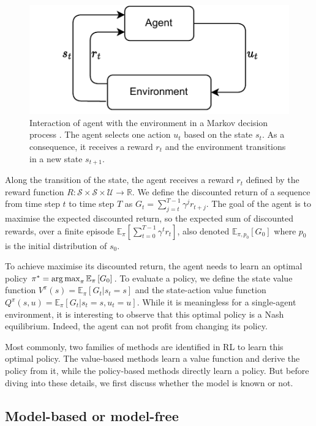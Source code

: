 \begin{figure}[h]
    \centering
    \includegraphics[width=.8\linewidth]{tex_thesis/figures/ch2/MDP.pdf}
    \caption{Interaction of agent with the environment in a Markov decision process \citep{sutton2018reinforcement}. The agent selects one action $u_t$ based on the state $s_t$. As a consequence, it receives a reward $r_t$ and the environment transitions in a new state $s_{t+1}$.}
    \label{fig:ch2_mdp}
\end{figure}

Along the transition of the state, the agent receives a reward $r_t$ defined by the reward function $R:\mathcal{S} \times \mathcal{S} \times \mathcal{U} \rightarrow \mathbb{R}$.
We define the discounted return of a sequence from time step $t$ to time step $T$ as $G_t= \sum_{j=t}^{T-1} \gamma^j r_{t+j}$.
The goal of the agent is to maximise the expected discounted return, so the expected sum of discounted rewards, over a finite episode $\mathbb{E}_{\pi} \left[\sum_{t=0}^{T-1} \gamma^t r_t \right]$, also denoted $\mathbb{E}_{\pi, p_0}\left[ G_0 \right]$ where $p_0$ is the initial distribution of $s_0$.

To achieve maximise its discounted return, the agent needs to learn an optimal policy $\pi^* = \operatorname*{arg\,max}_\pi \mathbb{E}_{\pi}\left[ G_0 \right]$.
To evaluate a policy, we define the state value function $V^\pi(s) = \mathbb{E}_{\pi}\left[G_t|s_t=s\right]$ and the state-action value function $Q^\pi(s, u) = \mathbb{E}_{\pi}\left[G_t|s_t=s, u_t=u\right]$.
While it is meaningless for a single-agent environment, it is interesting to observe that this optimal policy is a Nash equilibrium.
Indeed, the agent can not profit from changing its policy.

Most commonly, two families of methods are identified in RL to learn this optimal policy.
The value-based methods learn a value function and derive the policy from it, while the policy-based methods directly learn a policy.
But before diving into these details, we first discuss whether the model is known or not.

\subsection{Model-based or model-free}
\label{sec:ch2_model_based_vs_model_free}


